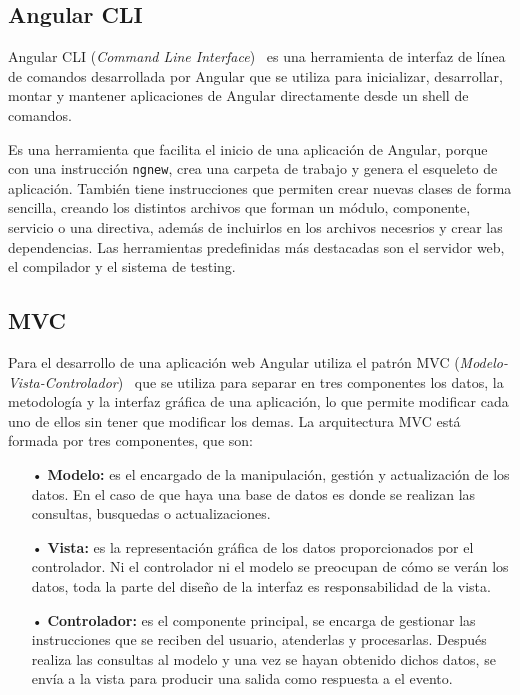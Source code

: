 \documentclass[a4paper, 12pt]{book}
\begin{document}
\subsection{Angular CLI}
\label{subsec:Angular CLI}

Angular CLI (\emph{Command Line Interface})~\cite{Pagina_de_angular_CLI} es una herramienta de interfaz de línea de comandos desarrollada por Angular que se utiliza para inicializar, desarrollar, montar y mantener aplicaciones de Angular directamente desde un shell de comandos. 

Es una herramienta que facilita el inicio de una aplicación de Angular, porque con una instrucción \texttt{ngnew}, crea una carpeta de trabajo y genera el esqueleto de aplicación. También tiene instrucciones que permiten crear nuevas clases de forma sencilla, creando los distintos archivos que forman un módulo, componente, servicio o una directiva, además de incluirlos en los archivos necesrios y crear las dependencias. Las herramientas predefinidas más destacadas son el servidor web, el compilador y el sistema de testing.


\subsection{MVC}
\label{subsec:MVC}

Para el desarrollo de una aplicación web Angular utiliza el patrón MVC (\emph{Modelo-Vista-Controlador})~\cite{Pagina_MVC} que se utiliza para separar en tres componentes los datos, la metodología y la interfaz gráfica de una aplicación, lo que permite modificar cada uno de ellos sin tener que modificar los demas. La arquitectura MVC está formada por tres componentes, que son:
	\begin{itemize}
	\item[•] \textbf{Modelo:} es el encargado de la manipulación, gestión y actualización de los datos. En el caso de que haya una base de datos es donde se realizan las consultas, busquedas o actualizaciones.  
	
	\item[•] \textbf{Vista:} es la representación gráfica de los datos proporcionados por el controlador. Ni el controlador ni el modelo se preocupan de cómo se verán los datos, toda la parte del diseño de la interfaz es responsabilidad de la vista.
	
	\item[•] \textbf{Controlador:} es el componente principal, se encarga de gestionar las instrucciones que se reciben del usuario, atenderlas y procesarlas. Después realiza las consultas al modelo y una vez se hayan obtenido dichos datos, se envía a la vista para producir una salida como respuesta a el evento.
	\end{itemize}
	
\end{document}
